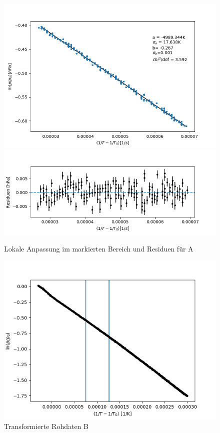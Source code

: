 \documentclass[12pt,a4paper]{article}
\begin{document}
\begin{figure}
\includegraphics[width=\linewidth]{Bilder/lokaler_fit_2A.png}
\includegraphics[width=\linewidth]{Bilder/lokale_Residuen_2A}
\caption[Lokale Anpassung]{Lokale Anpassung im markierten Bereich und Residuen für A}
\label{fig:fit_2A}
\end{figure}

\begin{figure}[H]
\begin{center}
\includegraphics[width=\linewidth]{Bilder/log_RohdatenB}
\caption[Rohdaten logarith. B]{Transformierte Rohdaten B}
\label{fig:logB}
\end{center}
\end{figure}
\end{document}
